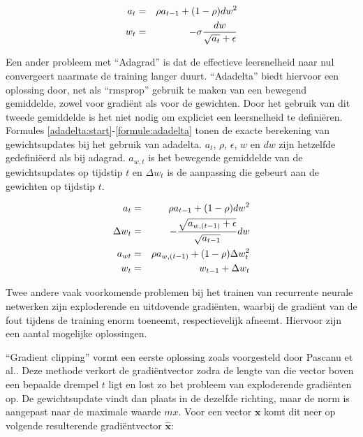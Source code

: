 \begin{eqnarray}
\vspace{-3mm}
    \label{rmsprop:start}
    a_t & = & \rho  a_{t-1} + (1 - \rho)dw^2 \\
    w_t & = &  - \sigma \frac{dw}{\sqrt{a_t} + \epsilon}
    \label{formule:rmsprop}
    \vspace{-3mm}
\end{eqnarray}

Een ander probleem met ``Adagrad'' is dat de effectieve leersnelheid naar nul convergeert naarmate de training langer duurt. ``Adadelta''\cite{Zeiler2012} biedt hiervoor een oplossing door, net als ``rmsprop'' gebruik te maken van een bewegend gemiddelde, zowel voor gradi\"ent als voor de gewichten. Door het gebruik van dit tweede gemiddelde is het niet nodig om expliciet een leersnelheid te defini\"eren. Formules \eqref{adadelta:start}-\eqref{formule:adadelta} tonen de exacte berekening van gewichtsupdates bij het gebruik van adadelta. $a_t$, $\rho$, $\epsilon$, $w$ en $dw$ zijn hetzelfde gedefini\"eerd als bij adagrad. $a_{w,t}$ is het bewegende gemiddelde van de gewichtsupdates op tijdstip $t$ en $\Delta w_t$ is de aanpassing die gebeurt aan de gewichten op tijdstip $t$.

\begin{eqnarray}
\vspace{-3mm}
    \label{adadelta:start}
    a_t & = & \rho  a_{t-1} + (1 - \rho)dw^2 \\
    \Delta w_t & = & - \frac{\sqrt{a_{w,(t-1)} + \epsilon}}{\sqrt{a_{t-1}}}dw \\
    a_{wt} & = & \rho  a_{w,(t-1)} + (1 - \rho)\Delta w_t^2 \\
    w_t & = & w_{t-1} + \Delta w_t
    \label{formule:adadelta}
    \vspace{-3mm}
\end{eqnarray}


Twee andere vaak voorkomende problemen bij het trainen van recurrente neurale netwerken zijn exploderende en uitdovende gradi\"enten, waarbij de gradi\"ent van de fout tijdens de training enorm toeneemt, respectievelijk afneemt. Hiervoor zijn een aantal mogelijke oplossingen.

``Gradient clipping'' vormt een eerste oplossing zoals voorgesteld door Pascanu et al.\cite{Pascanu2012}. Deze methode verkort de gradi\"entvector zodra de lengte van die vector boven een bepaalde drempel $t$ ligt en lost zo het probleem van exploderende gradi\"enten op. De gewichtsupdate vindt dan plaats in de dezelfde richting, maar de norm is aangepast naar de maximale waarde $mx$. Voor een vector $\mathbf{x}$ komt dit neer op volgende resulterende gradi\"entvector $\mathbf{\hat{x}}$:

